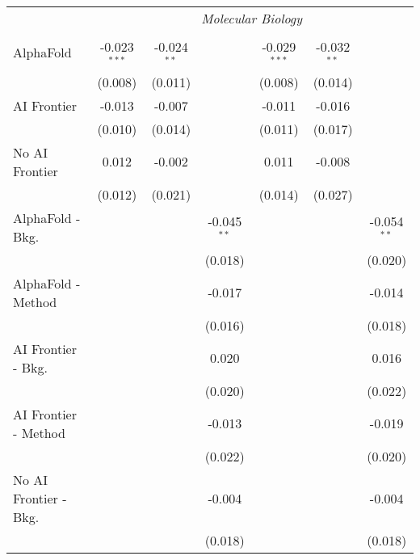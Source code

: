 \begin{tabular}{lcccccc}
 & \multicolumn{6}{c}{\textit{Molecular Biology}} \\ \\
   AlphaFold               & -0.023$^{***}$ & -0.024$^{**}$ &               & -0.029$^{***}$ & -0.032$^{**}$ &   \\   
                           & (0.008)        & (0.011)       &               & (0.008)        & (0.014)       &   \\   
   AI Frontier             & -0.013         & -0.007        &               & -0.011         & -0.016        &   \\   
                           & (0.010)        & (0.014)       &               & (0.011)        & (0.017)       &   \\   
   No AI Frontier          & 0.012          & -0.002        &               & 0.011          & -0.008        &   \\   
                           & (0.012)        & (0.021)       &               & (0.014)        & (0.027)       &   \\   
   AlphaFold - Bkg.        &                &               & -0.045$^{**}$ &                &               & -0.054$^{**}$\\   
                           &                &               & (0.018)       &                &               & (0.020)\\   
   AlphaFold - Method      &                &               & -0.017        &                &               & -0.014\\   
                           &                &               & (0.016)       &                &               & (0.018)\\   
   AI Frontier - Bkg.      &                &               & 0.020         &                &               & 0.016\\   
                           &                &               & (0.020)       &                &               & (0.022)\\   
   AI Frontier - Method    &                &               & -0.013        &                &               & -0.019\\   
                           &                &               & (0.022)       &                &               & (0.020)\\   
   No AI Frontier - Bkg.   &                &               & -0.004        &                &               & -0.004\\   
                           &                &               & (0.018)       &                &               & (0.018)\\   

\end{tabular}
